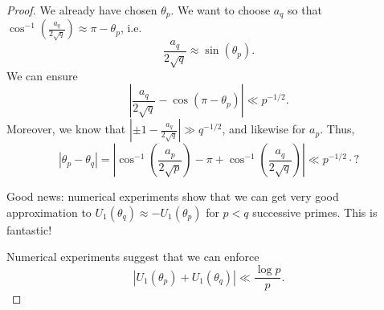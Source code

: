 \documentclass{article}
\begin{document}
\begin{proof}
We already have chosen $\theta_p$. We want to choose $a_q$ so that 
$\cos^{-1}(\frac{a_q}{2\sqrt q}) \approx \pi-\theta_p$, i.e.
\[
	\frac{a_q}{2\sqrt q} \approx \sin(\theta_p) .
\]
We can ensure 
\[
	\left| \frac{a_q}{2\sqrt q} - \cos(\pi - \theta_p)\right| \ll p^{-1/2} .
\]
Moreover, we know that $|\pm 1 - \frac{a_q}{2\sqrt q}| \gg q^{-1/2}$, and 
likewise for $a_p$. Thus, 
\[
	|\theta_p - \theta_q| = \left|\cos^{-1}\left(\frac{a_p}{2\sqrt p}\right) - \pi +  \cos^{-1}\left(\frac{a_q}{2\sqrt q}\right)\right| \ll p^{-1/2} \cdot ?
\]

Good news: numerical experiments show that we can get very good approximation 
to $U_1(\theta_q) \approx - U_1(\theta_p)$ for $p<q$ successive primes. This 
is fantastic!

Numerical experiments suggest that we can enforce 
\[
	|U_1(\theta_p)+U_1(\theta_q)| \ll \frac{\log p}{p} .
\]



\end{proof}
\end{document}
